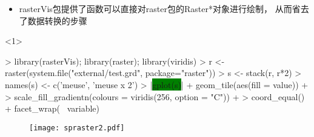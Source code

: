 \begin{frame}[t,fragile]{\subsecname}{\subsubsecname}
\begin{itemize} 
\item<1-> rasterVis包提供了函数可以直接对raster包的Raster*对象进行绘制，
从而省去了数据转换的步骤
\end{itemize}

\begin{overlayarea}{\textwidth}{\textheight}
\begin{onlyenv}<1>
\begin{rcode}
> library(rasterVis); library(raster); library(viridis)
> r <- raster(system.file("external/test.grd", package="raster"))
> s <- stack(r, r*2)
> names(s) <- c('meuse', 'meuse x 2')
> |\colorbox{green}{gplot(s)}| + geom_tile(aes(fill = value)) +
>     scale_fill_gradientn(colours = viridis(256, option = "C")) +
>     coord_equal() + facet_wrap(~ variable)
\end{rcode}
\begin{figure}[ht] \vspace{-10pt}
  \centering 
  \texttt{[image: spraster2.pdf]}
\end{figure}
\end{onlyenv}
\end{overlayarea}
\end{frame}

